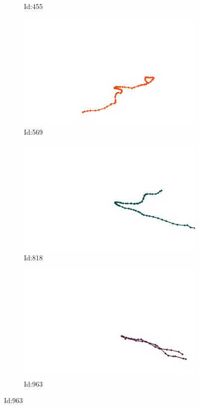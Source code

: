 \documentclass[12pt,twoside]{report}
\begin{document}
\begin{figure}
\begin{subfigure}[b]{0.20\textwidth}
\caption{Id:455}
\end{subfigure}
\begin{subfigure}[b]{0.20\textwidth}
\centering
\includegraphics[width=\textwidth]{../../trajectories/569.png}
\caption{Id:569}
\end{subfigure}
\begin{subfigure}[b]{0.20\textwidth}
\centering
\includegraphics[width=\textwidth]{../../trajectories/818.png}
\caption{Id:818}
\end{subfigure}
\begin{subfigure}[b]{0.20\textwidth}
\centering
\includegraphics[width=\textwidth]{../../trajectories/963.png}
\caption{Id:963}
\end{subfigure}
\end{figure}
\end{document}
